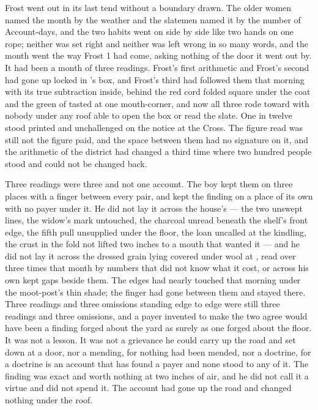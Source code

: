 Frost went out in its last tend without a boundary drawn. The older women named the month by the weather and the slatemen named it by the number of Account-days, and the two habits went on side by side like two hands on one rope; neither was set right and neither was left wrong in so many words, and the month went the way Frost 1 had come, asking nothing of the door it went out by. It had been a month of three readings. Frost's first arithmetic and Frost's second had gone up  locked in 's box, and Frost's third had followed them that morning with its true subtraction inside, behind the red cord folded square under the coat and the green of tasted  at one mouth-corner, and now all three rode toward  with nobody under any roof able to open the box or read the slate. One in twelve stood printed and unchallenged on the notice at the Cross. The figure read was still not the figure paid, and the space between them had no signature on it, and the arithmetic of the district had changed a third time where two hundred people stood and could not be changed back.

Three readings were three and not one account. The boy kept them on three places with a finger between every pair, and kept the finding on a place of its own with no payer under it. He did not lay it across the house's  --- the two unswept lines, the widow's mark untouched, the charcoal unread beneath the shelf's front edge, the fifth pull unsupplied under the floor, the loan uncalled at the kindling, the crust in the fold not lifted two inches to a mouth that wanted it --- and he did not lay it across the dressed grain lying covered under wool at , read over three times that month by numbers that did not know what it cost, or across his own kept gaps beside them. The edges had nearly touched that morning under the moot-post's thin shade; the finger had gone between them and stayed there. Three readings and three omissions standing edge to edge were still three readings and three omissions, and a payer invented to make the two agree would have been a finding forged about the yard as surely as one forged about the floor. It was not a lesson. It was not a grievance he could carry up the road and set down at a door, nor a mending, for nothing had been mended, nor a doctrine, for a doctrine is an account that has found a payer and none stood to any of it. The finding was exact and worth nothing at two inches of air, and he did not call it a virtue and did not spend it. The account had gone up the road and changed nothing under the roof.

